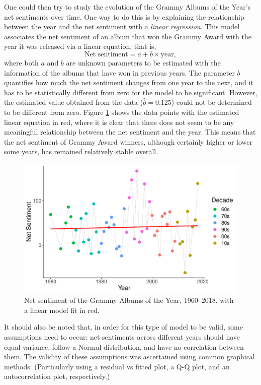 \documentclass{article}
\newenvironment{aside}
  {\begin{mdframed}[style=0,%
      leftline=false,rightline=false,leftmargin=2em,rightmargin=2em,%
          innerleftmargin=0pt,innerrightmargin=0pt,linewidth=0.75pt,%
      skipabove=7pt,skipbelow=7pt]\small}
  {\end{mdframed}}
\begin{document}
One could then try to study the evolution of the Grammy Albums of the Year's net sentiments over time. One way to do this is by explaining the relationship between the year and the net sentiment with a \textit{linear regression}. This model associates the net sentiment of an album that won the Grammy Award with the year it was released via a linear equation, that is,
\begin{equation*}
    \text{Net sentiment} = a + b \times \text{year},
\end{equation*}
where both $a$ and $b$ are unknown parameters to be estimated with the information of the albums that have won in previous years. The parameter $b$ quantifies how much the net sentiment changes from one year to the next, and it has to be statistically different from zero for the model to be significant. However, the estimated value obtained from the data ($\hat{b} = 0.125$) could not be determined to be different from zero. Figure \ref{fig:sentiment_lm} shows the data points with the estimated linear equation in red, where it is clear that there does not seem to be any meaningful relationship between the net sentiment and the year. This means that the net sentiment of Grammy Award winners, although certainly higher or lower some years, has remained relatively stable overall.  


\begin{figure}[h]
    \centering
    \includegraphics[scale=0.5]{Plots/graph_sentiment_linear_trend.pdf}
    \caption{Net sentiment of the Grammy Albums of the Year, 1960--2018, with a linear model fit in red.}
    \label{fig:sentiment_lm}
\end{figure}


\begin{aside}
        It should also be noted that, in order for this type of model to be valid, some assumptions need to occur: net sentiments across different years should have equal variance, follow a Normal distribution, and have no correlation between them. The validity of these assumptions was ascertained using common graphical methods. (Particularly using a residual vs fitted plot, a Q-Q plot, and an autocorrelation plot, respectively.)
\end{aside}
\end{document}
